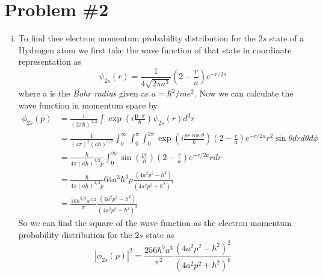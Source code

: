 \documentclass[11pt]{article}
\numberwithin{equation}{section}
\begin{document}
\section{Problem \#2}
\begin{enumerate}[(i)]
\item To find thee electron momentum probability distribution for the $2s$ state of a Hydrogen
atom we first take the wave function of that state in coordinate representation as
$$\psi_{2s}(r) = \frac{1}{4\sqrt{2\pi{a^3}}} \left(2-\frac{r}{a}\right)e^{-r/2a}$$
where a is the \emph{Bohr radius} given as $a = \hbar^2/me^2$. Now we can calculate the 
wave function in momentum space by
\begin{align*}
\phi_{2s}(p) &= \frac{1}{(2\pi\hbar)^{3/2}}\int\exp\left(i\frac{\mathbf{p}\cdot\mathbf{r}}{\hbar}\right)\psi_{2s}(r)d^3r\\
&= \frac{1}{(4\pi)^2(a\hbar)^{3/2}}\int_{0}^{\infty}\int_{0}^{\pi}\int_{0}^{2\pi}\exp\left(i\frac{pr\cos\theta}{\hbar}\right)\left(2-\frac{r}{a}\right)e^{-r/2a}r^2\sin\theta{dr}{d\theta}{d\phi}\\
&= \frac{\hbar}{4\pi(a\hbar)^{3/2}p}\int_{0}^{\infty}\sin\left(\frac{pr}{\hbar}\right)\left(2-\frac{r}{a}\right)e^{-r/2a}r{dr}\\
&= \frac{\hbar}{4\pi(a\hbar)^{3/2}p}64a^3\hbar^3p\frac{(4a^2p^2-\hbar^2)}{(4a^2p^2+\hbar^2)^3}\\
&= \frac{16\hbar^{5/2}a^{3/2}}{\pi}\frac{(4a^2p^2-\hbar^2)}{(4a^2p^2+\hbar^2)^3}
\end{align*}
So we can find the square of the wave function as the electron momentum probability distribution
for the $2s$ state as
$$|\phi_{2s}(p)|^2 = \frac{256\hbar^{5}a^{3}}{\pi^2}\frac{(4a^2p^2-\hbar^2)^2}{(4a^2p^2+\hbar^2)^6}$$


\end{enumerate}
\end{document}
